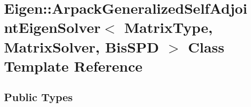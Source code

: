 \hypertarget{class_eigen_1_1_arpack_generalized_self_adjoint_eigen_solver}{}\section{Eigen\+:\+:Arpack\+Generalized\+Self\+Adjoint\+Eigen\+Solver$<$ Matrix\+Type, Matrix\+Solver, Bis\+S\+PD $>$ Class Template Reference}
\label{class_eigen_1_1_arpack_generalized_self_adjoint_eigen_solver}
\subsection*{Public Types}
